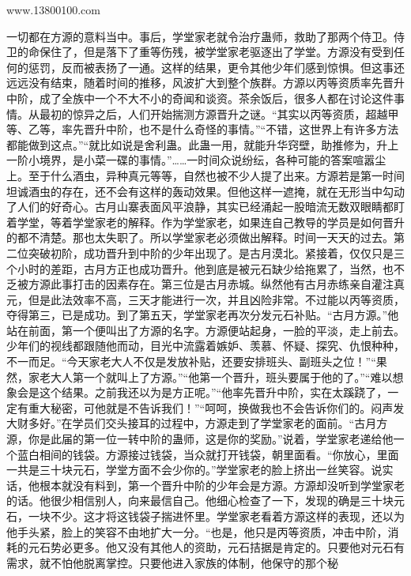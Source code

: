 
\begin{this_body}

www.13800100.com

一切都在方源的意料当中。事后，学堂家老就令治疗蛊师，救助了那两个侍卫。侍卫的命保住了，但是落下了重等伤残，被学堂家老驱逐出了学堂。方源没有受到任何的惩罚，反而被表扬了一通。这样的结果，更令其他少年们感到惊惧。但这事还远远没有结束，随着时间的推移，风波扩大到整个族群。方源以丙等资质率先晋升中阶，成了全族中一个不大不小的奇闻和谈资。茶余饭后，很多人都在讨论这件事情。从最初的惊异之后，人们开始揣测方源晋升之谜。“其实以丙等资质，超越甲等、乙等，率先晋升中阶，也不是什么奇怪的事情。”“不错，这世界上有许多方法都能做到这点。”“就比如说是舍利蛊。此蛊一用，就能升华窍壁，助推修为，升上一阶小境界，是小菜一碟的事情。”……一时间众说纷纭，各种可能的答案喧嚣尘上。至于什么酒虫，异种真元等等，自然也被不少人提了出来。方源若是第一时间坦诚酒虫的存在，还不会有这样的轰动效果。但他这样一遮掩，就在无形当中勾动了人们的好奇心。古月山寨表面风平浪静，其实已经涌起一股暗流无数双眼睛都盯着学堂，等着学堂家老的解释。作为学堂家老，如果连自己教导的学员是如何晋升的都不清楚。那也太失职了。所以学堂家老必须做出解释。时间一天天的过去。第二位突破初阶，成功晋升到中阶的少年出现了。是古月漠北。紧接着，仅仅只是三个小时的差距，古月方正也成功晋升。他到底是被元石缺少给拖累了，当然，也不乏被方源此事打击的因素存在。第三位是古月赤城。纵然他有古月赤练亲自灌注真元，但是此法效率不高，三天才能进行一次，并且凶险非常。不过能以丙等资质，夺得第三，已是成功。到了第五天，学堂家老再次分发元石补贴。“古月方源。”他站在前面，第一个便叫出了方源的名字。方源便站起身，一脸的平淡，走上前去。少年们的视线都跟随他而动，目光中流露着嫉妒、羡慕、怀疑、探究、仇恨种种，不一而足。“今天家老大人不仅是发放补贴，还要安排班头、副班头之位！”“果然，家老大人第一个就叫上了方源。”“他第一个晋升，班头要属于他的了。”“难以想象会是这个结果。之前我还以为是方正呢。”“他率先晋升中阶，实在太蹊跷了，一定有重大秘密，可他就是不告诉我们！”“呵呵，换做我也不会告诉你们的。闷声发大财多好。”在学员们交头接耳的过程中，方源走到了学堂家老的面前。“古月方源，你是此届的第一位一转中阶的蛊师，这是你的奖励。”说着，学堂家老递给他一个蓝白相间的钱袋。方源接过钱袋，当众就打开钱袋，朝里面看。“你放心，里面一共是三十块元石，学堂方面不会少你的。”学堂家老的脸上挤出一丝笑容。说实话，他根本就没有料到，第一个晋升中阶的少年会是方源。方源却没听到学堂家老的话。他很少相信别人，向来最信自己。他细心检查了一下，发现的确是三十块元石，一块不少。这才将这钱袋子揣进怀里。学堂家老看着方源这样的表现，还以为他手头紧，脸上的笑容不由地扩大一分。“也是，他只是丙等资质，冲击中阶，消耗的元石势必更多。他又没有其他人的资助，元石拮据是肯定的。只要他对元石有需求，就不怕他脱离掌控。只要他进入家族的体制，他保守的那个秘
\end{this_body}
